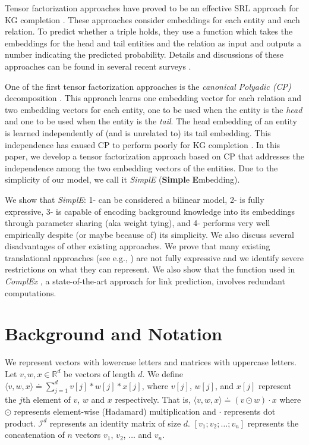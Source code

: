 \documentclass{article}
\newcommand{\eye}{\ensuremath{\mathcal{I}}}
\begin{document}
Tensor factorization approaches have proved to be an effective SRL approach for KG completion \cite{nickel2012factorizing,bordes2013translating,trouillon2016complex,StransE}. These approaches consider embeddings for each entity and each relation. To predict whether a triple holds, they use a function which takes the embeddings for the head and tail entities and the relation as input and outputs a number indicating the predicted probability. Details and discussions of these approaches can be found in several recent surveys \cite{nguyen2017overview,wang2017knowledge}.

One of the first tensor factorization approaches is the \emph{canonical Polyadic (CP)} decomposition \cite{hitchcock1927expression}. This approach learns one embedding vector for each relation and two embedding vectors for each entity, one to be used when the entity is the \emph{head} and one to be used when the entity is the \emph{tail}. 
The head embedding of an entity is learned independently of (and is unrelated to) its tail embedding.
This independence has caused CP to perform poorly for KG completion \cite{trouillon2017knowledge}. In this paper, we develop a tensor factorization approach based on CP that addresses the independence among the two embedding vectors of the entities. Due to the simplicity of our model, we call it \emph{SimplE} (\textbf{Simpl}e \textbf{E}mbedding). 

We show that \emph{SimplE}: 1- can be considered a bilinear model, 2- is fully expressive, 3- is capable of encoding background knowledge into its embeddings through parameter sharing (aka weight tying), and 4- performs very well empirically despite (or maybe because of) its simplicity. We also discuss several disadvantages of other existing approaches. We prove that many existing translational approaches (see e.g., \cite{bordes2013translating,ji2015knowledge,wang2014knowledge,StransE}) are not fully expressive and we identify severe restrictions on what they can represent. We also show that the function used in \emph{ComplEx} \cite{trouillon2016complex,trouillon2017knowledge}, a state-of-the-art approach for link prediction, involves redundant computations.

\section{Background and Notation}
We represent vectors with lowercase letters and matrices with uppercase letters. Let $v,w,x\in\mathbb{R}^d$ be vectors of length $d$. We define $\langle v, w, x \rangle \doteq \sum_{j=1}^d v[j] * w[j] * x[j]$, where $v[j]$, $w[j]$, and $x[j]$ represent the $j$th element of $v$, $w$ and $x$ respectively. That is, $\langle v, w, x \rangle \doteq (v \odot w) \cdot x$ where $\odot$ represents element-wise (Hadamard) multiplication and $\cdot$ represents dot product. $\eye^{d}$ represents an identity matrix of size $d$. $[v_1;v_2;\dots;v_n]$ represents the concatenation of $n$ vectors $v_1$, $v_2$, $\dots$ and $v_n$.
\end{document}
